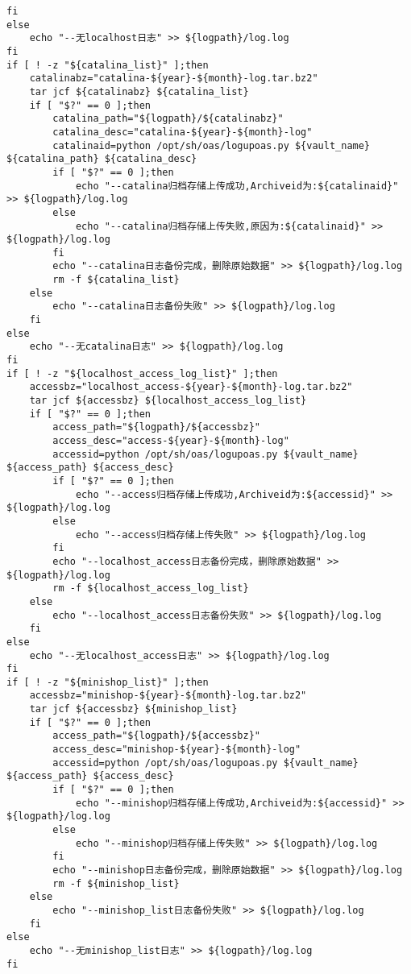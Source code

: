 \begin{lstlisting}[numbers=none]
    fi
else
    echo "--无localhost日志" >> ${logpath}/log.log
fi
if [ ! -z "${catalina_list}" ];then
    catalinabz="catalina-${year}-${month}-log.tar.bz2"
    tar jcf ${catalinabz} ${catalina_list}
    if [ "$?" == 0 ];then
        catalina_path="${logpath}/${catalinabz}"
        catalina_desc="catalina-${year}-${month}-log"
        catalinaid=python /opt/sh/oas/logupoas.py ${vault_name} ${catalina_path} ${catalina_desc}
        if [ "$?" == 0 ];then
            echo "--catalina归档存储上传成功,Archiveid为:${catalinaid}" >> ${logpath}/log.log
        else
            echo "--catalina归档存储上传失败,原因为:${catalinaid}" >> ${logpath}/log.log
        fi
        echo "--catalina日志备份完成，删除原始数据" >> ${logpath}/log.log
        rm -f ${catalina_list}
    else
        echo "--catalina日志备份失败" >> ${logpath}/log.log
    fi
else
    echo "--无catalina日志" >> ${logpath}/log.log
fi
if [ ! -z "${localhost_access_log_list}" ];then
    accessbz="localhost_access-${year}-${month}-log.tar.bz2"
    tar jcf ${accessbz} ${localhost_access_log_list}
    if [ "$?" == 0 ];then
        access_path="${logpath}/${accessbz}"
        access_desc="access-${year}-${month}-log"
        accessid=python /opt/sh/oas/logupoas.py ${vault_name} ${access_path} ${access_desc} 
        if [ "$?" == 0 ];then
            echo "--access归档存储上传成功,Archiveid为:${accessid}" >> ${logpath}/log.log
        else
            echo "--access归档存储上传失败" >> ${logpath}/log.log
        fi
        echo "--localhost_access日志备份完成，删除原始数据" >> ${logpath}/log.log
        rm -f ${localhost_access_log_list}
    else
        echo "--localhost_access日志备份失败" >> ${logpath}/log.log
    fi
else
    echo "--无localhost_access日志" >> ${logpath}/log.log
fi
if [ ! -z "${minishop_list}" ];then
    accessbz="minishop-${year}-${month}-log.tar.bz2"
    tar jcf ${accessbz} ${minishop_list}
    if [ "$?" == 0 ];then
        access_path="${logpath}/${accessbz}"
        access_desc="minishop-${year}-${month}-log"
        accessid=python /opt/sh/oas/logupoas.py ${vault_name} ${access_path} ${access_desc}
        if [ "$?" == 0 ];then
            echo "--minishop归档存储上传成功,Archiveid为:${accessid}" >> ${logpath}/log.log
        else
            echo "--minishop归档存储上传失败" >> ${logpath}/log.log
        fi
        echo "--minishop日志备份完成，删除原始数据" >> ${logpath}/log.log
        rm -f ${minishop_list}
    else
        echo "--minishop_list日志备份失败" >> ${logpath}/log.log
    fi
else
    echo "--无minishop_list日志" >> ${logpath}/log.log
fi

\end{lstlisting}